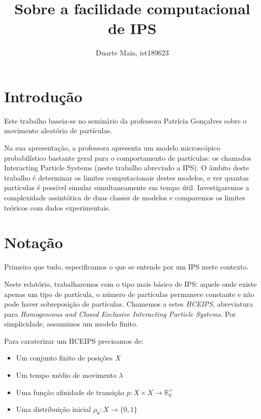 \documentclass{article}
\title{Sobre a facilidade computacional de IPS}
\author{Duarte Maia, ist189623}
\date{}
\newcommand{\R}{\mathbb{R}}
\begin{document}
	\maketitle
	
	\tableofcontents

	\section{Introdução}

	Este trabalho baseia-se no seminário da professora Patrícia Gonçalves sobre o movimento aleatório de partículas.
	
	Na sua apresentação, a professora apresenta um modelo microscópico probabilístico bastante geral para o comportamento de partículas: os chamados Interacting Particle Systems (neste trabalho abreviado a IPS). O âmbito deste trabalho é determinar os limites computacionais destes modelos, e ver quantas partículas é possível simular simultaneamente em tempo útil. Investigaremos a complexidade assintótica de duas classes de modelos e comparemos os limites teóricos com dados experimentais.

	\section{Notação}

	Primeiro que tudo, especificamos o que se entende por um IPS neste contexto.
	
	Neste relatório, trabalharemos com o tipo mais básico de IPS: aquele onde existe apenas um tipo de partícula, o número de partículas permanece constante e não pode haver sobreposição de partículas. Chamemos a estes \emph{HCEIPS}, abreviatura para \emph{Homogeneous and Closed Exclusive Interacting Particle Systems}. Por simplicidade, assumimos um modelo finito.
	
	Para caraterizar um HCEIPS precisamos de:
	
	\begin{itemize}
	\item Um conjunto finito de posições $X$
	
	\item Um tempo médio de movimento $\lambda$
	
	\item Uma função afinidade de transição $p : X \times X \rightarrow \R^+_0$
	
	\item Uma distribuição inicial $\rho_0 : X \rightarrow \{0,1\}$
	\end{itemize}
	
\end{document}
